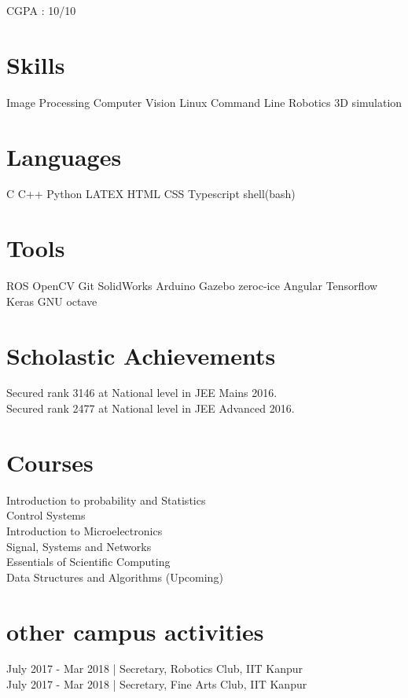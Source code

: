 \documentclass[]{deedy-resume-openfont}
\begin{document}
CGPA : 10/10
\sectionsep

\section{Skills}
Image Processing \textbullet{} Computer Vision \textbullet{} Linux Command Line \textbullet{} Robotics \textbullet{} 3D simulation
\section{Languages}
C \textbullet{}   C++ \textbullet{} Python \textbullet{} LATEX \textbullet{} HTML \textbullet{} CSS \textbullet{} Typescript \textbullet{} shell(bash)
\section{Tools}
ROS \textbullet{} OpenCV \textbullet{} Git \textbullet{} SolidWorks \textbullet{} Arduino \textbullet{} Gazebo \textbullet{} zeroc-ice \textbullet{} Angular \textbullet{} Tensorflow \textbullet{} Keras \textbullet{} GNU octave
\sectionsep
\hfill

\section{Scholastic Achievements}
 Secured rank 3146 at National level in JEE Mains 2016. \\ 
 Secured rank 2477 at National level in JEE Advanced 2016.
\sectionsep

\section{Courses}
Introduction to probability and Statistics \\
Control Systems \\
Introduction to Microelectronics \\
Signal, Systems and Networks \\
Essentials of Scientific Computing \\
Data Structures and Algorithms (Upcoming)
\sectionsep

\section{other campus activities}
July 2017 - Mar 2018 | Secretary, Robotics Club, IIT Kanpur \\
July 2017 - Mar 2018 | Secretary, Fine Arts Club, IIT Kanpur \\
\end{document}
